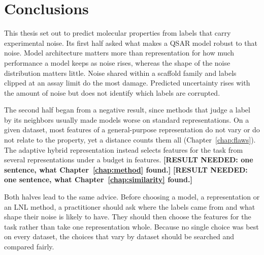 \section{Conclusions}\label{sec:discussion:conclusions}

This thesis set out to predict molecular properties from labels that carry experimental noise. Its first half asked what makes a QSAR model robust to that noise. Model architecture matters more than representation for how much performance a model keeps as noise rises, whereas the shape of the noise distribution matters little. Noise shared within a scaffold family and labels clipped at an assay limit do the most damage. Predicted uncertainty rises with the amount of noise but does not identify which labels are corrupted.

The second half began from a negative result, since methods that judge a label by its neighbors usually made models worse on standard representations. On a given dataset, most features of a general-purpose representation do not vary or do not relate to the property, yet a distance counts them all (Chapter~\ref{chap:flaws}). The adaptive hybrid representation instead selects features for the task from several representations under a budget in features. \textbf{[RESULT NEEDED: one sentence, what Chapter~\ref{chap:method} found.]} \textbf{[RESULT NEEDED: one sentence, what Chapter~\ref{chap:similarity} found.]}

Both halves lead to the same advice. Before choosing a model, a representation or an LNL method, a practitioner should ask where the labels came from and what shape their noise is likely to have. They should then choose the features for the task rather than take one representation whole. Because no single choice was best on every dataset, the choices that vary by dataset should be searched and compared fairly.

